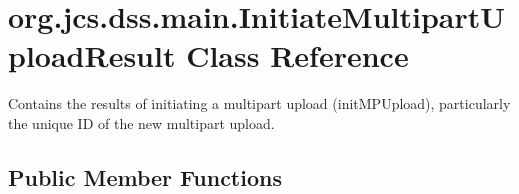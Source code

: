 \hypertarget{classorg_1_1jcs_1_1dss_1_1main_1_1InitiateMultipartUploadResult}{}\section{org.\+jcs.\+dss.\+main.\+Initiate\+Multipart\+Upload\+Result Class Reference}
\label{classorg_1_1jcs_1_1dss_1_1main_1_1InitiateMultipartUploadResult}


Contains the results of initiating a multipart upload (init\+M\+P\+Upload), particularly the unique ID of the new multipart upload.  


\subsection*{Public Member Functions}
